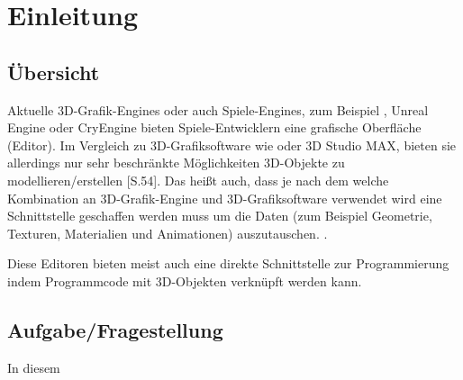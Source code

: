 \section{Einleitung}

\subsection{Übersicht}

Aktuelle 3D-Grafik-Engines oder auch Spiele-Engines, zum Beispiel , Unreal Engine oder CryEngine bieten Spiele-Entwicklern eine grafische Oberfläche (Editor). Im Vergleich zu 3D-Grafiksoftware wie  oder 3D Studio MAX, bieten sie allerdings nur sehr beschränkte Möglichkeiten 3D-Objekte zu modellieren/erstellen \cite{Gregory.2014}[S.54]. Das heißt auch, dass je nach dem welche Kombination an 3D-Grafik-Engine und 3D-Grafiksoftware verwendet wird eine Schnittstelle geschaffen werden muss um die Daten (zum Beispiel Geometrie, Texturen, Materialien und Animationen) auszutauschen. .

Diese Editoren bieten meist auch eine direkte Schnittstelle zur Programmierung indem Programmcode mit 3D-Objekten verknüpft werden kann.


\subsection{Aufgabe/Fragestellung}

In diesem 